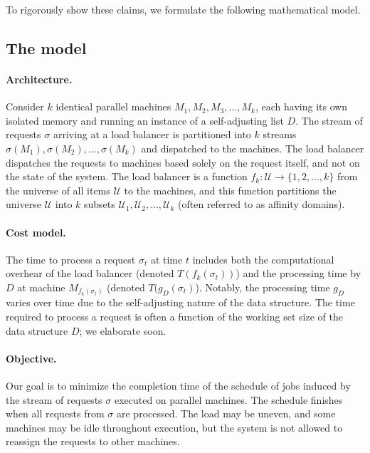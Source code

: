 To rigorously show these claims, we formulate the following mathematical model.


\subsection{The model}
\label{sec:model}

\paragraph{Architecture.}

Consider $k$ identical parallel machines $M_1, M_2, M_3, \ldots, M_k$, each having its own isolated memory and running an instance of a self-adjusting list $D$.
The stream of requests $\sigma$ arriving at a load balancer is partitioned into $k$ streams $\sigma(M_1), \sigma(M_2), \ldots, \sigma(M_k)$ and dispatched to the machines.
The load balancer dispatches the requests to machines based solely on the request itself, and not on the state of the system.
The load balancer is a function $f_k : \mathcal{U} \to \{1, 2, \ldots, k\}$ from the universe of all items $\mathcal{U}$ to the machines, and this function partitions the universe $\mathcal{U}$ into $k$ subsets $\mathcal{U}_1, \mathcal{U}_2, \ldots, \mathcal{U}_k$ (often referred to as affinity domains).

\paragraph{Cost model.}

The time to process a request $\sigma_t$ at time $t$ includes both the computational overhear of the load balancer (denoted $T(f_k(\sigma_t))$) and the processing time by $D$ at machine $M_{f_k(\sigma_t)}$ (denoted $T(g_D(\sigma_t)$).
Notably, the processing time $g_D$ varies over time due to the self-adjusting nature of the data structure.
The time required to process a request is often a function of the working set size of the data structure $D$; we elaborate soon. 


\paragraph*{Objective.}
Our goal is to minimize the completion time of the schedule of jobs induced by the stream of requests $\sigma$ executed on parallel machines.
The schedule finishes when all requests from $\sigma$ are processed.
The load may be uneven, and some machines may be idle throughout execution, but the system is not allowed to reassign the requests to other machines.


